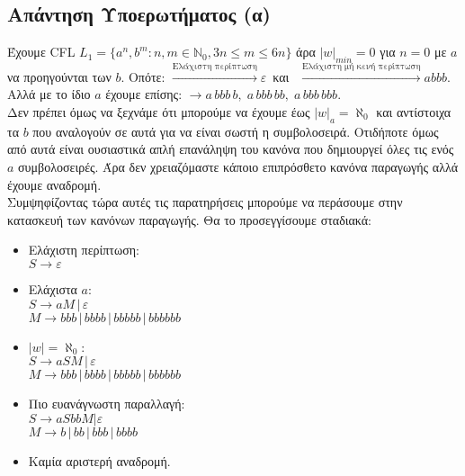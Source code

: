 \subsection{Απάντηση Υποερωτήματος (α)}
\label{ssec:Solution_1.1}
\doublespacing
Έχουμε CFL
$ L_1 = \{a^n, b^m : n, m \in \mathbb{N}_0, 3n \leq m \leq 6n \}$
άρα $\vert w \vert_{min} = 0$ για $n = 0$ με $a$ να προηγούνται των $b$. Οπότε:
$\overset{\text{Ελάχιστη περίπτωση}}{\rightarrow} ε\,$ και
$\;\,\overset{\text{Ελάχιστη μή κενή περίπτωση}}{\rightarrow} abbb$.\\
Αλλά με το ίδιο $a$ έχουμε επίσης: $\rightarrow a\,bbb\,b,\; a\,bbb\,bb,\; a\,bbb\,bbb$.\\
Δεν πρέπει όμως να ξεχνάμε ότι μπορούμε να έχουμε έως $|w|_a = \aleph_0$ και αντίστοιχα τα $b$ που αναλογούν σε
αυτά για να είναι σωστή η συμβολοσειρά. Οτιδήποτε όμως από αυτά είναι ουσιαστικά απλή επανάληψη του κανόνα που
δημιουργεί όλες τις ενός $a$ συμβολοσειρές. Άρα δεν χρειαζόμαστε κάποιο
επιπρόσθετο κανόνα παραγωγής αλλά έχουμε αναδρομή.\\
Συμψηφίζοντας τώρα αυτές τις παρατηρήσεις μπορούμε να περάσουμε στην κατασκευή των κανόνων παραγωγής. Θα το
προσεγγίσουμε σταδιακά:
\begin{itemize}
	\itemsep0em

	\item Ελάχιστη περίπτωση:\\
	$S \rightarrow ε$

	\item Ελάχιστα $a$:\\
	$S \rightarrow aΜ \,|\, ε$\\
	$M \rightarrow bbb \,|\, bbbb \,|\, bbbbb \,|\, bbbbbb$

	\item $|w| = \aleph_0$:\\
	$S \rightarrow aSM \,|\, ε$\\
	$M \rightarrow bbb \,|\, bbbb \,|\, bbbbb \,|\, bbbbbb$

	\item Πιο ευανάγνωστη παραλλαγή:\\
	$S \rightarrow aSbbM | ε$\\
	$M \rightarrow b \,|\, bb \,|\, bbb \,|\, bbbb$

	\item Καμία αριστερή αναδρομή.
\end{itemize}

